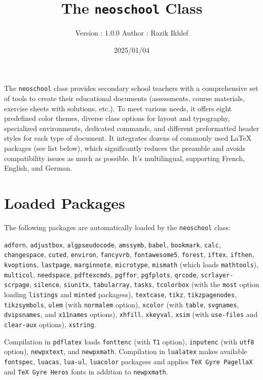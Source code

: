 \documentclass[
    margin=2cm
]{neoschool}
\title{The \texttt{neoschool} Class}
\author{Version : 1.0.0 \quad\textemdash{}\quad Author : Razik Ikhlef}
\date{2025/01/04}
\begin{document}
\maketitle

The \texttt{neoschool} class provides secondary school
teachers with a comprehensive set of tools to create their educational
documents (assessments, course materials, exercise sheets with
solutions, etc.). To meet various needs, it offers eight predefined
color themes, diverse class options for layout and typography,
specialized environments, dedicated commands, and different preformatted
header styles for each type of document. It integrates dozens of
commonly used LaTeX packages (see list below), which significantly
reduces the preamble and avoids compatibility issues as much as
possible. It's multilingual, supporting French, English, and German.

\tableofcontents

\section{Loaded Packages}

The following packages are automatically loaded by the
\texttt{neoschool} class:

\texttt{adforn}, \texttt{adjustbox}, \texttt{algpseudocode},
\texttt{amssymb}, \texttt{babel}, \texttt{bookmark}, \texttt{calc},
\texttt{changespace}, \texttt{cuted}, \texttt{environ},
\texttt{fancyvrb}, \texttt{fontawesome5}, \texttt{forest},
\texttt{iftex}, \texttt{ifthen}, \texttt{kvoptions}, \texttt{lastpage},
\texttt{marginnote}, \texttt{microtype}, \texttt{mismath} (which loads
\texttt{mathtools}), \texttt{multicol}, \texttt{needspace},
\texttt{pdftexcmds}, \texttt{pgffor}, \texttt{pgfplots},
\texttt{qrcode}, \texttt{scrlayer-scrpage}, \texttt{silence},
\texttt{siunitx}, \texttt{tabularray}, \texttt{tasks},
\texttt{tcolorbox} (with the \texttt{most} option loading
\texttt{listings} and \texttt{minted} packagess), \texttt{textcase},
\texttt{tikz}, \texttt{tikzpagenodes}, \texttt{tikzsymbols},
\texttt{ulem} (with \texttt{normalem} option), \texttt{xcolor} (with
\texttt{table}, \texttt{svgnames}, \texttt{dvipsnames}, and
\texttt{x11names} options), \texttt{xhfill}, \texttt{xkeyval},
\texttt{xsim} (with \texttt{use-files} and \texttt{clear-aux} options),
\texttt{xstring}.

Compilation in \texttt{pdflatex} loads \texttt{fonttenc} (with
\texttt{T1} option), \texttt{inputenc} (with \texttt{utf8} option),
\texttt{newpxtext}, and \texttt{newpxmath}. Compilation in
\texttt{lualatex} makes available \texttt{fontspec}, \texttt{luacas},
\texttt{lua-ul}, \texttt{luacolor} packagess and applies
\texttt{TeX\ Gyre\ PagellaX} and \texttt{TeX\ Gyre\ Heros} fonts in
addition to \texttt{newpxmath}.
\end{document}
